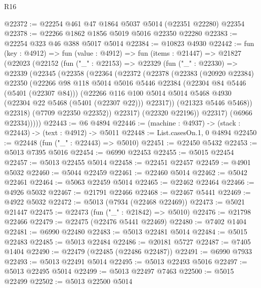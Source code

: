 \begin{lexlean}{R16}
\begin{coremodule}
@22372 := @22254 @461 @47 @1864 @5037 @5014 (@22351 @22280) @22354
@22378 := @22266 @1862 @1856 @5019 @5016 @22350 @22280
@22383 := @22254 @323 @46 @388 @5017 @5014
@22384 := @10823 @4930
@22442 := fun (key : @4912) =>
  fun (value : @4912) =>
  fun (items : @21447) =>
  @21827
    (@22023
      (@22152
        (fun ("_" : @22153) =>
        @22329
          (fun ("_" : @22330) =>
          @22339
            (@22345
              (@22358
                (@22364
                  (@22372
                    (@22378
                      (@22383
                        (@20920 @22384)
                        @22350
                        (@22266
                          @98
                          @118
                          @5014
                          @5016
                          @5446
                          @22384
                          (@22304 @84 @5446 (@5401 (@22307 @84)))
                          (@22266
                            @116
                            @100
                            @5014
                            @5014
                            @5468
                            @4930
                            (@22304 @22 @5468 (@5401 (@22307 @22)))
                            @22317))
                        (@21323 @5446 @5468))
                      @22318)
                    (@7709 @22350 @22352))
                  @22317)
                (@22320 @22196))
              @22317)
            (@6966 @22334)))))
@22443 := @6 @4894
@22446 := (machine : @4937) -> (stack : @22443) -> (text : @4912) -> @5011
@22448 := List.casesOn.{1, 0} @4894
@22450 := @22448 (fun ("_" : @22443) => @5010)
@22451 := @22450 @5432
@22453 := @5013 @7395 @5016
@22454 := @6990 @22453
@22455 := @5015 @22454
@22457 := @5013 @22455 @5014
@22458 := @22451 @22457
@22459 := @4901 @5032
@22460 := @5044 @22459
@22461 := @22460 @5014
@22462 := @5042 @22461
@22464 := @5063 @22459 @5014
@22465 := @22462 @22464
@22466 := @4926 @5032
@22467 := @21791 @22466
@22468 := @22467 @5441
@22469 := @4922 @5032
@22472 := @5013 (@7934 (@22468 @22469))
@22473 := @5021 @21447
@22475 := @22473 (fun ("_" : @21842) => @5010)
@22476 := @21798 @22466
@22479 := @22475 (@22476 @5441 @22469)
@22480 := @7402 @1404
@22481 := @6990 @22480
@22483 := @5013 @22481 @5014
@22484 := @5015 @22483
@22485 := @5013 @22484
@22486 := @20181 @5727
@22487 := @7405 @1404
@22490 := @22479 (@22485 (@22486 @22487))
@22491 := @6990 @7933
@22493 := @5013 @22491 @5014
@22495 := @5013 @22493 @5016
@22497 := @5013 @22495 @5014
@22499 := @5013 @22497 @7463
@22500 := @5015 @22499
@22502 := @5013 @22500 @5014

\end{coremodule}
\end{lexlean}
